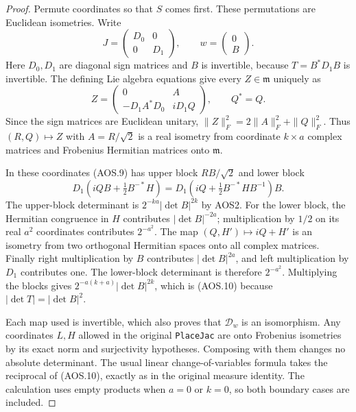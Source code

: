 \begin{proof}
Permute coordinates so that $S$ comes first.  These permutations are
Euclidean isometries.  Write
\[
       J=\begin{pmatrix}D_0&0\\0&D_1\end{pmatrix},
       \qquad w=\begin{pmatrix}0\\B\end{pmatrix}.
\]
Here $D_0,D_1$ are diagonal sign matrices and $B$ is invertible,
because $T=B^*D_1B$ is invertible.  The defining Lie algebra equations
give every $Z\in\mathfrak m$ uniquely as
\[
 Z=\begin{pmatrix}
       0&A\\-D_1A^*D_0&iD_1Q
    \end{pmatrix},\qquad Q^*=Q.
 \tag{AOS.11}
\]
Since the sign matrices are Euclidean unitary,
$\|Z\|_F^2=2\|A\|_F^2+\|Q\|_F^2$.
Thus $(R,Q)\mapsto Z$ with $A=R/\sqrt2$ is a real isometry
from coordinate $k\times a$ complex matrices and Frobenius Hermitian
matrices onto $\mathfrak m$.

In these coordinates (AOS.9) has upper block
$RB/\sqrt2$ and lower block
\[
       D_1\left(iQB+\tfrac12B^{-*}H\right)
       =D_1\left(iQ+\tfrac12B^{-*}HB^{-1}\right)B.
 \tag{AOS.12}
\]
The upper-block determinant is $2^{-ka}|\det B|^{2k}$ by AOS2.
For the lower block, the Hermitian congruence in $H$ contributes
$|\det B|^{-2a}$; multiplication by $1/2$ on its real $a^2$
coordinates contributes $2^{-a^2}$.  The map
$(Q,H')\mapsto iQ+H'$ is an isometry from two orthogonal Hermitian
spaces onto all complex matrices.  Finally right multiplication by
$B$ contributes $|\det B|^{2a}$, and left multiplication by $D_1$
contributes one.  The lower-block determinant is therefore
$2^{-a^2}$.  Multiplying the blocks gives
$2^{-a(k+a)}|\det B|^{2k}$, which is (AOS.10) because
$|\det T|=|\det B|^2$.

Each map used is invertible, which also proves that $\mathcal D_w$
is an isomorphism.  Any coordinates $L,H$ allowed in the original
\texttt{PlaceJac} are onto Frobenius isometries by its exact norm and
surjectivity hypotheses.  Composing with them changes no absolute
determinant.  The usual linear change-of-variables formula takes the
reciprocal of (AOS.10), exactly as in the original measure identity.
The calculation uses empty products when $a=0$ or $k=0$, so both
boundary cases are included.
\end{proof}

